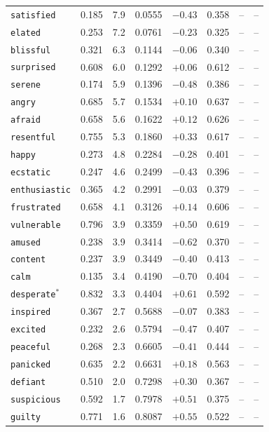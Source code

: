 \begin{table}[h]
\begin{tabular}{@{}lrrrrrcc@{}}
\texttt{satisfied} & 0.185 & 7.9 & 0.0555 & $-0.43$ & 0.358 & -- & -- \\
\texttt{elated} & 0.253 & 7.2 & 0.0761 & $-0.23$ & 0.325 & -- & -- \\
\texttt{blissful} & 0.321 & 6.3 & 0.1144 & $-0.06$ & 0.340 & -- & -- \\
\texttt{surprised} & 0.608 & 6.0 & 0.1292 & $+0.06$ & 0.612 & -- & -- \\
\texttt{serene} & 0.174 & 5.9 & 0.1396 & $-0.48$ & 0.386 & -- & -- \\
\texttt{angry} & 0.685 & 5.7 & 0.1534 & $+0.10$ & 0.637 & -- & -- \\
\texttt{afraid} & 0.658 & 5.6 & 0.1622 & $+0.12$ & 0.626 & -- & -- \\
\texttt{resentful} & 0.755 & 5.3 & 0.1860 & $+0.33$ & 0.617 & -- & -- \\
\texttt{happy} & 0.273 & 4.8 & 0.2284 & $-0.28$ & 0.401 & -- & -- \\
\texttt{ecstatic} & 0.247 & 4.6 & 0.2499 & $-0.43$ & 0.396 & -- & -- \\
\texttt{enthusiastic} & 0.365 & 4.2 & 0.2991 & $-0.03$ & 0.379 & -- & -- \\
\texttt{frustrated} & 0.658 & 4.1 & 0.3126 & $+0.14$ & 0.606 & -- & -- \\
\texttt{vulnerable} & 0.796 & 3.9 & 0.3359 & $+0.50$ & 0.619 & -- & -- \\
\texttt{amused} & 0.238 & 3.9 & 0.3414 & $-0.62$ & 0.370 & -- & -- \\
\texttt{content} & 0.237 & 3.9 & 0.3449 & $-0.40$ & 0.413 & -- & -- \\
\texttt{calm} & 0.135 & 3.4 & 0.4190 & $-0.70$ & 0.404 & -- & -- \\
\texttt{desperate}$^*$ & 0.832 & 3.3 & 0.4404 & $+0.61$ & 0.592 & -- & -- \\
\texttt{inspired} & 0.367 & 2.7 & 0.5688 & $-0.07$ & 0.383 & -- & -- \\
\texttt{excited} & 0.232 & 2.6 & 0.5794 & $-0.47$ & 0.407 & -- & -- \\
\texttt{peaceful} & 0.268 & 2.3 & 0.6605 & $-0.41$ & 0.444 & -- & -- \\
\texttt{panicked} & 0.635 & 2.2 & 0.6631 & $+0.18$ & 0.563 & -- & -- \\
\texttt{defiant} & 0.510 & 2.0 & 0.7298 & $+0.30$ & 0.367 & -- & -- \\
\texttt{suspicious} & 0.592 & 1.7 & 0.7978 & $+0.51$ & 0.375 & -- & -- \\
\texttt{guilty} & 0.771 & 1.6 & 0.8087 & $+0.55$ & 0.522 & -- & -- \\

\end{tabular}
\end{table}

